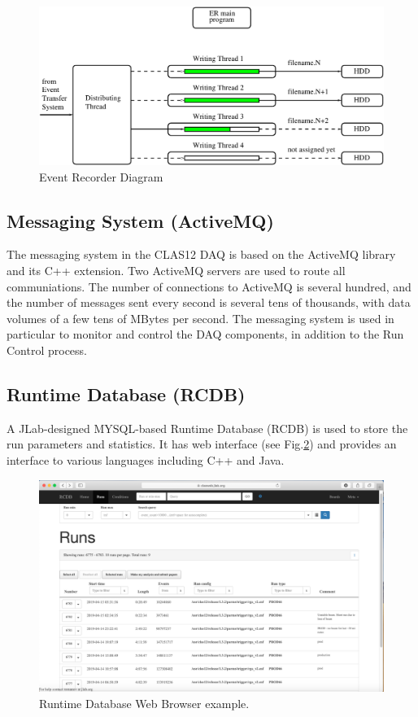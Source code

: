\begin{figure}[hbt]
	\centering
	\includegraphics[width=1.0\columnwidth,keepaspectratio]{img/er_diagram.pdf}
	\caption{Event Recorder Diagram}
	\label{fig:er_diagram}
\end{figure}


\subsection{Messaging System (ActiveMQ)}

The messaging system in the CLAS12 DAQ is based on the ActiveMQ library and its C++ extension. Two ActiveMQ servers are used to route all communiations. The number of connections to ActiveMQ is several hundred, and the number of messages sent every second is several tens of thousands, with data volumes of a few tens of MBytes per second. The messaging system is used in particular to monitor and control the DAQ components, in addition to the Run Control process.


\subsection{Runtime Database (RCDB)}

A JLab-designed MYSQL-based Runtime Database (RCDB) is used to store the run parameters and statistics. It has web interface (see Fig.\ref{fig:rcdb}) and provides an interface to various languages including C++ and Java.

\begin{figure}[hbt]
	\centering
	\includegraphics[width=1.0\columnwidth,keepaspectratio]{img/rcdb.png}
	\caption{Runtime Database Web Browser example.}
	\label{fig:rcdb}
\end{figure}

